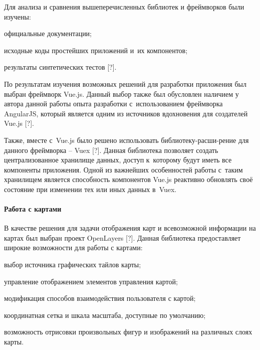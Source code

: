 Для анализа и сравнения вышеперечисленных библиотек и фреймворков были изучены:
\begin{dashitemize}
  \item официальные документации;
  \item исходные коды простейших приложений и~их компонентов;
  \item результаты синтетических тестов [?].
\end{dashitemize}

По результатам изучения возможных решений для разработки приложения был выбран фреймворк Vue.js. Данный выбор также был обусловлен наличием у автора данной работы опыта разработки с~использованием фреймворка AngularJS, который является одним из источников вдохновения для создателей Vue.js [?].

Также, вместе с~Vue.js было решено использовать библиотеку-расши-рение для данного фреймворка -- Vuex [?]. Данная библиотека позволяет создать централизованное хранилище данных, доступ к~которому будут иметь все компоненты приложения. Одной из важнейших особенностей работы с~таким хранилищем является способность компонентов Vue.js реактивно обновлять своё состояние при изменении тех или иных данных в~Vuex.


\paragraph{Работа с картами}

В качестве решения для задачи отображения карт и всевозможной информации на картах был выбран проект OpenLayers [?]. Данная библиотека предоставляет широкие возможности для работы с картами:
\begin{dashitemize}
  \item выбор источника графических тайлов карты;
  \item управление отображением элементов управления картой;
  \item модификация способов взаимодействия пользователя с картой;
  \item координатная сетка и шкала масштаба, доступные по умолчанию;
  \item возможность отрисовки произвольных фигур и изображений на различных слоях карты.
\end{dashitemize}

